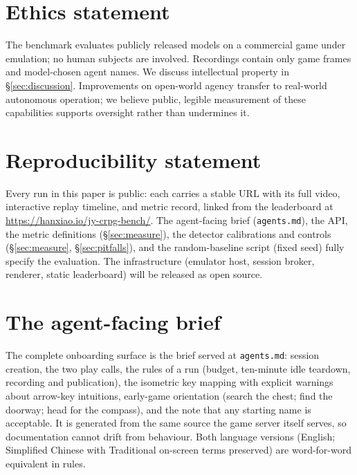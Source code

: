 \documentclass{article} %
\begin{document}
\section*{Ethics statement}
The benchmark evaluates publicly released models on a commercial game under
emulation; no human subjects are involved. Recordings contain only game
frames and model-chosen agent names. We discuss intellectual property in
\S\ref{sec:discussion}. Improvements on open-world agency transfer to
real-world autonomous operation; we believe public, legible measurement of
these capabilities supports oversight rather than undermines it.

\section*{Reproducibility statement}
Every run in this paper is public: each carries a stable URL with its full
video, interactive replay timeline, and metric record, linked from the
leaderboard at \url{https://hanxiao.io/jy-crpg-bench/}. The agent-facing
brief (\texttt{agents.md}), the API, the metric definitions
(\S\ref{sec:measure}), the detector calibrations and controls
(\S\ref{sec:measure}, \S\ref{sec:pitfalls}), and the random-baseline script
(fixed seed) fully specify the evaluation. The infrastructure (emulator
host, session broker, renderer, static leaderboard) will be released as
open source.




\appendix

\section{The agent-facing brief}
\label{app:brief}
The complete onboarding surface is the brief served at
\texttt{agents.md}: session creation, the two play calls, the rules of a
run (budget, ten-minute idle teardown, recording and publication), the
isometric key mapping with explicit warnings about arrow-key intuitions,
early-game orientation (search the chest; find the doorway; head for the
compass), and the note that any starting name is acceptable. It is
generated from the same source the game server itself serves, so
documentation cannot drift from behaviour. Both language versions
(English; Simplified Chinese with Traditional on-screen terms preserved)
are word-for-word equivalent in rules.
\end{document}
